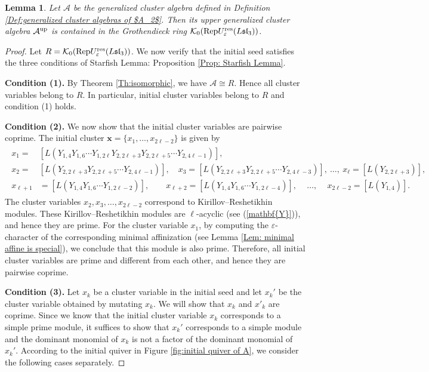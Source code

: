 \documentclass[11pt, reqno]{amsart}
\theoremstyle{plain}
\newtheorem{lemma}[theorem]{Lemma}
\theoremstyle{definition}
\numberwithin{equation}{section}
\newcommand{\res}{{\rm res}}
\newcommand{\Rep}{{\rm Rep}}
\begin{document}
\begin{lemma} \label{lem:upper generalized cluster algebra is contained in Grothendieck ring}
Let $\mathcal{A}$ be the generalized cluster algebra defined in Definition \ref{Def:generalized cluster algebras of $A_2$}. Then its upper generalized cluster algebra $\mathcal{A}^{\rm up}$ is contained in the Grothendieck ring $\mathcal{K}_0(\Rep U_{\varepsilon}^{\res}({L\mathfrak{sl}_{3}}))$. 
\end{lemma}

\begin{proof}
Let $R=\mathcal{K}_0(\Rep U_{\varepsilon}^{\res}(L\mathfrak{sl}_3))$. We now verify that the initial seed satisfies the three conditions of Starfish Lemma: Proposition \ref{Prop: Starfish Lemma}. 

{\bf Condition (1).} By Theorem \ref{Th:isomorphic}, we have $\mathcal{A} \cong R$. Hence all cluster variables belong to $R$. In particular, initial cluster variables belong to $R$ and condition (1) holds. 

{\bf Condition (2).} We now show that the initial cluster variables are pairwise coprime. The initial cluster $\mathbf{x}=\{x_1,\dots,x_{2\ell-2}\}$ is given by
\begin{align} \label{eq:initial cluster variables for type A2}
\begin{split}
x_1 =& [L(Y_{1,4}Y_{1,6}\cdots Y_{1, 2 \ell}Y_{2,2\ell+3}Y_{2,2\ell+5}\cdots Y_{2,4\ell -1})],\\
x_2 =& [L(Y_{2,2\ell+3}Y_{2,2\ell+5}\cdots Y_{2,4\ell -1})], \quad
x_3 = [L(Y_{2,2\ell+3}Y_{2,2\ell+5}\cdots Y_{2,4\ell -3})], \ \ldots, \ 
x_\ell = [L(Y_{2,2\ell+3})],\\
x_{\ell+1}& = [L(Y_{1,4}Y_{1,6}\cdots Y_{1, 2 \ell-2})], \qquad
x_{\ell+2} = [L(Y_{1,4}Y_{1,6}\cdots Y_{1, 2 \ell-4})], \,\quad\ldots, \,\quad
x_{2\ell-2} = [L(Y_{1,4})].
\end{split} 
\end{align}
The cluster variables $x_2, x_3, \ldots, x_{2\ell-2}$ correspond to Kirillov--Reshetikhin modules. These Kirillov--Reshetikhin modules are $\ell$-acyclic (see (\ref{mathbf{Y}})), and hence they are prime. For the cluster variable $x_1$, by computing the $\varepsilon$-character of the corresponding minimal affinization (see Lemma \ref{Lem: minimal affine is special}), we conclude that this module is also prime. Therefore, all initial cluster variables are prime and different from each other, and hence they are pairwise coprime.

{\bf Condition (3).} Let $x_k$ be a cluster variable in the initial seed and let $x_k'$ be the cluster variable obtained by mutating $x_k$. We will show that $x_k$ and $x'_k$ are coprime. Since we know that the initial cluster variable $x_k$ corresponds to a simple prime module, it suffices to show that $x_k'$ corresponds to a simple module and the dominant monomial of $x_k$ is not a factor of the dominant monomial of $x_k'$. According to the initial quiver in Figure \ref{fig:initial quiver of A}, we consider the following cases separately.


\end{proof}
\end{document}
